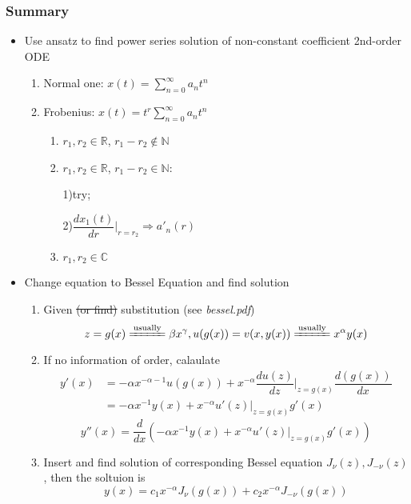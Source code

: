 \documentclass{beamer}
\begin{document}
\begin{frame}
\frametitle{Summary}
\begin{itemize}
\item Use ansatz to find power series solution of non-constant coefficient 2nd-order ODE 
\begin{enumerate}
\item Normal one: $x(t)=\sum\limits_{n=0}^{\infty}a_nt^n$
\item Frobenius: $x(t)=t^r\sum\limits_{n=0}^{\infty}a_nt^n$
\begin{enumerate}
\item $r_1,r_2\in\mathbb{R}$, $r_1-r_2\notin\mathbb{N}$
\item $r_1,r_2\in\mathbb{R}$, $r_1-r_2\in\mathbb{N}$: 

1)try; 

2)$\dfrac{dx_1(t)}{dr}\Big|_{r=r_2}\Rightarrow a'_n(r)$

\item $r_1,r_2\in\mathbb{C}$
\end{enumerate}
\end{enumerate}
\end{itemize}
\end{frame}

\begin{frame}
\begin{itemize}
\item Change equation to Bessel Equation and find solution
\begin{enumerate}
\item Given \sout{(or find)} substitution (see \textit{bessel.pdf})
$$z=g(x)\xlongequal{\text{usually}}\beta x^{\gamma}, u(g(x))=v(x,y(x))\xlongequal{\text{usually}}x^{\alpha}y(x)$$
\item If no information of order, calaulate
\begin{align*}
y'(x)&=-\alpha x^{-\alpha-1}u(g(x))+x^{-\alpha}\dfrac{du(z)}{dz}\Bigg|_{z=g(x)}\dfrac{d(g(x))}{dx}\\
&=-\alpha x^{-1}y(x)+x^{-\alpha}u'(z)|_{z=g(x)}g'(x)
\end{align*}
$$y''(x)=\dfrac{d}{dx}(-\alpha x^{-1}y(x)+x^{-\alpha}u'(z)|_{z=g(x)}g'(x))$$
\item Insert and find solution of corresponding Bessel equation $J_{\nu}(z),J_{-\nu}(z)$, then the soltuion is $$y(x)=c_1x^{-\alpha}J_{\nu}(g(x))+c_2x^{-\alpha}J_{-\nu}(g(x))$$
\end{enumerate}

\end{itemize}
\end{frame}
\end{document}
